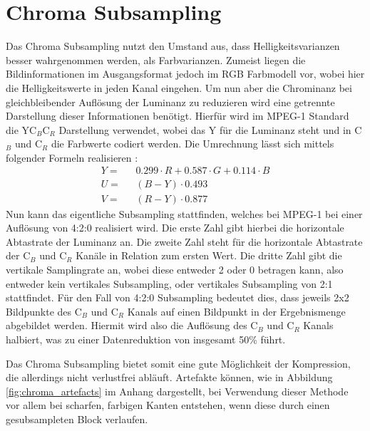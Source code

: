 \section{Chroma Subsampling}

Das Chroma Subsampling nutzt den Umstand aus, dass Helligkeitsvarianzen besser wahrgenommen werden, als Farbvarianzen. Zumeist liegen die Bildinformationen im Ausgangsformat jedoch im RGB Farbmodell vor, wobei hier die Helligkeitswerte in jeden Kanal eingehen. Um nun aber die Chrominanz bei gleichbleibender Auflösung der Luminanz zu reduzieren wird eine getrennte Darstellung dieser Informationen benötigt. Hierfür wird im MPEG-1 Standard die YC$_B$C$_R$ Darstellung verwendet, wobei das Y für die Luminanz steht und in C$_B$ und C$_R$ die Farbwerte codiert werden. Die Umrechnung lässt sich mittels folgender Formeln realisieren \cite{itu-t_recommendation_1995}:
\thickmuskip
\begin{align*}
	Y = & \text{ } 0.299 \cdot R + 0.587 \cdot G + 0.114 \cdot B \\
	U = & \text{ } (B - Y) \cdot 0.493 \\
	V = & \text{ } (R - Y) \cdot 0.877
\end{align*}
Nun kann das eigentliche Subsampling stattfinden, welches bei MPEG-1 bei einer Auflösung von 4:2:0 realisiert wird. Die erste Zahl gibt hierbei die horizontale Abtastrate der Luminanz an. Die zweite Zahl steht für die horizontale Abtastrate der C$_B$ und C$_R$ Kanäle in Relation zum ersten Wert. Die dritte Zahl gibt die vertikale Samplingrate an, wobei diese entweder 2 oder 0 betragen kann, also entweder kein vertikales Subsampling, oder vertikales Subsampling von 2:1 stattfindet. Für den Fall von 4:2:0 Subsampling bedeutet dies, dass jeweils 2x2 Bildpunkte des C$_B$ und C$_R$ Kanals auf einen Bildpunkt in der Ergebnismenge abgebildet werden. Hiermit wird also die Auflösung des C$_B$ und C$_R$ Kanals halbiert, was zu einer Datenreduktion von insgesamt 50\% führt. \cite{poynton_chroma_????} %

Das Chroma Subsampling bietet somit eine gute Möglichkeit der Kompression, die allerdings nicht verlustfrei abläuft. Artefakte können, wie in Abbildung \ref{fig:chroma_artefacts} im Anhang dargestellt, bei Verwendung dieser Methode vor allem bei scharfen, farbigen Kanten entstehen, wenn diese durch einen gesubsampleten Block verlaufen.



